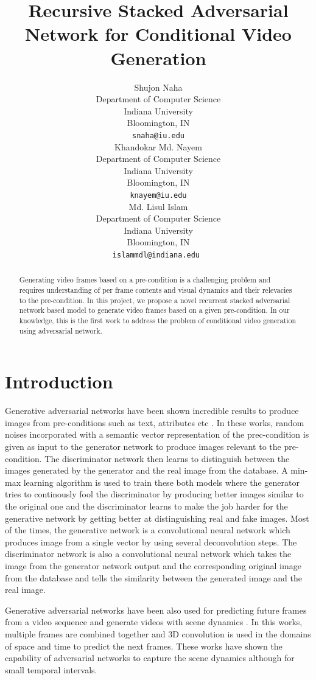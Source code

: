 \documentclass{article}
\title{Recursive Stacked Adversarial Network for Conditional Video Generation}
\author{
  Shujon Naha \\
  Department of Computer Science\\
  Indiana University\\
  Bloomington, IN \\
  \texttt{snaha@iu.edu} \\
   \And
   Khandokar Md. Nayem \\
  Department of Computer Science\\   
  Indiana University\\
  Bloomington, IN \\
   \texttt{knayem@iu.edu} \\
   \AND
   Md. Lisul Islam\\
  Department of Computer Science\\   
  Indiana University\\
  Bloomington, IN \\
   \texttt{islammdl@indiana.edu } \\
}
\begin{document}

\maketitle

\begin{abstract}
  Generating video frames based on a pre-condition is a challenging problem and requires understanding of per frame contents and visual dynamics and their relevacies to the pre-condition. In this project, we propose a novel recurrent stacked adversarial network based model to generate video frames based on a given pre-condition. In our knowledge, this is the first work to address the problem of conditional video generation using adversarial network.
\end{abstract}


\section{Introduction}
Generative adversarial networks have been shown incredible results to produce images from pre-conditions such as text, attributes etc \cite{stackGAN, attribute2image}. In these works, random noises incorporated with a semantic vector representation of the prec-condition is given as input to the generator network to produce images relevant to the pre-condition. The discriminator network then learns to distinguish between the images generated by the generator and the real image from the database. A min-max learning algorithm is used to train these both models where the generator tries to continously fool the discriminator by producing better images similar to the original one and the discriminator learns to make the job harder for the generative network by getting better at distinguishing real and fake images. Most of the times, the generative network is a convolutional neural network which produces image from a single vector by using several deconvolution steps. The discriminator network is also a convolutional neural network which takes the image from the generator network output and the corresponding original image from the database and tells the similarity between the generated image and the real image. 


Generative adversarial networks have been also used for predicting future frames from a video sequence and generate videos with scene dynamics \cite{deepMSE, genVSD}. In this works, multiple frames are combined together and 3D convolution is used in the domains of space and time to predict the next frames. These works have shown the capability of adversarial networks to capture the scene dynamics although for small temporal intervals.
\end{document}
